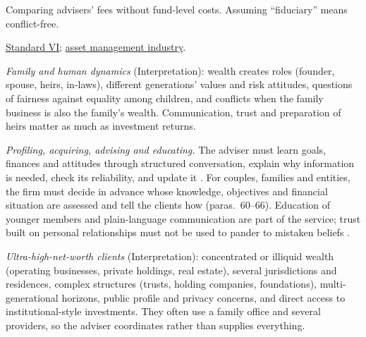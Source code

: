 \begin{qfdefinition}
 Comparing advisers' fees without fund-level costs. Assuming ``fiduciary'' means conflict-free.

 \hyperref[rule:standard-conflicts-of-interest]{Standard VI}; \hyperref[def:asset-management-industry]{asset management industry}.

\end{qfdefinition}

\begin{qfmethod}\label{meth:advising-families}
 \emph{Family and human dynamics} (Interpretation): wealth creates roles (founder, spouse, heirs, in-laws), different generations' values and risk attitudes, questions of fairness against equality among children, and conflicts when the family business is also the family's wealth. Communication, trust and preparation of heirs matter as much as investment returns.

\emph{Profiling, acquiring, advising and educating.} The adviser must learn goals, finances and attitudes through structured conversation, explain why information is needed, check its reliability, and update it \citep[paras.~11--16, 44, 53]{esma-suitability-guidelines-2022}. For couples, families and entities, the firm must decide in advance whose knowledge, objectives and financial situation are assessed and tell the clients how (paras.~60--66). Education of younger members and plain-language communication are part of the service; trust built on personal relationships must not be used to pander to mistaken beliefs \citep[pp.~3--5]{gennaioli-shleifer-vishny-money-doctors-2012}.

\emph{Ultra-high-net-worth clients} (Interpretation): concentrated or illiquid wealth (operating businesses, private holdings, real estate), several jurisdictions and residences, complex structures (trusts, holding companies, foundations), multi-generational horizons, public profile and privacy concerns, and direct access to institutional-style investments. They often use a family office and several providers, so the adviser coordinates rather than supplies everything.


\end{qfmethod}
